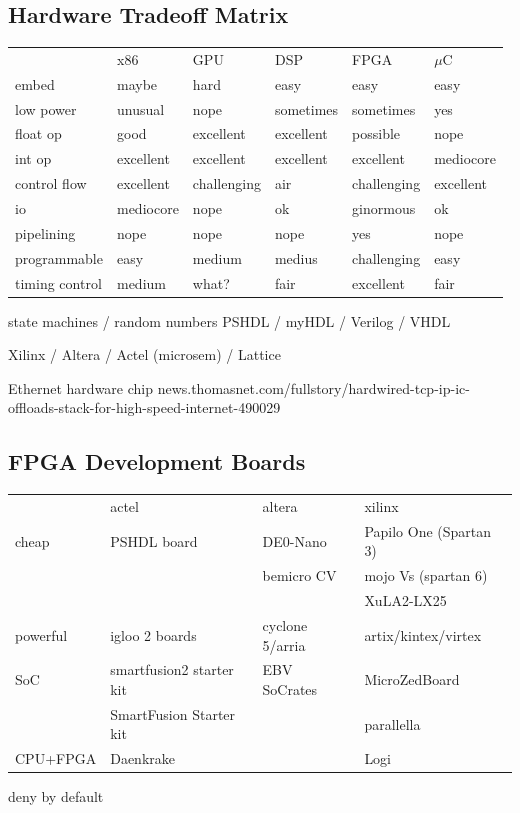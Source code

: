 \subsection{Hardware Tradeoff Matrix\cite{4}}
\begin{tabular}{llllll}
         &x86&GPU&DSP&FPGA&$\mu{}$C\\
embed   &maybe &hard      &easy      &easy&easy\\
low power&unusual &nope  &sometimes &sometimes &yes\\
float op&good&excellent&excellent&possible&nope\\
int op&excellent&excellent&excellent&excellent&mediocore\\
control flow&excellent&challenging&air&challenging&excellent\\
io&mediocore&nope&ok&ginormous&ok\\
pipelining&nope&nope&nope&yes&nope\\
programmable&easy&medium&medius&challenging&easy\\
timing control&medium&what?&fair&excellent&fair\\
\end{tabular}

state machines / random numbers 
PSHDL / myHDL / Verilog / VHDL

Xilinx / Altera / Actel (microsem) / Lattice

Ethernet hardware chip
news.thomasnet.com/fullstory/hardwired-tcp-ip-ic-offloads-stack-for-high-speed-internet-490029

\subsection{FPGA Development Boards\cite{4}}
\begin{tabular}{llll}
& actel&altera&xilinx\\
cheap&PSHDL board&DE0-Nano&Papilo One (Spartan 3)\\
&&bemicro CV&mojo Vs (spartan 6)\\
&&&XuLA2-LX25\\
powerful&igloo 2 boards&cyclone 5/arria&artix/kintex/virtex\\
SoC&smartfusion2 starter kit&EBV SoCrates&MicroZedBoard\\
&SmartFusion Starter kit&&parallella\\
CPU+FPGA&Daenkrake&&Logi\\
\end{tabular}

deny by default


